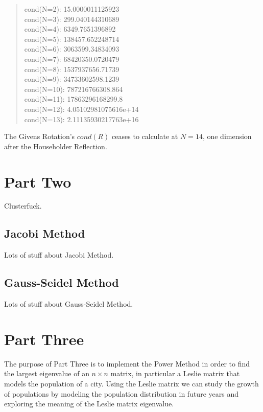 \documentclass[letterpaper,12pt]{article}
\begin{document}
\begin{quote}
cond(N=2):  15.0000011125923
\\cond(N=3):  299.040144310689
\\cond(N=4):  6349.7651396892
\\cond(N=5):  138457.652248714
\\cond(N=6):  3063599.34834093
\\cond(N=7):  68420350.0720479
\\cond(N=8):  1537937656.71739
\\cond(N=9):  34733602598.1239
\\cond(N=10): 787216766308.864
\\cond(N=11): 17863296168299.8
\\cond(N=12): 4.05102981075616e+14
\\cond(N=13): 2.11135930217763e+16
\end{quote}

The Givens Rotation's $cond(R)$ ceases to calculate at $N=14$,
one dimension after the Householder Reflection.

\newpage
\section{Part Two}


Clusterfuck.

\subsection{Jacobi Method}

Lots of stuff about Jacobi Method.

\subsection{Gauss-Seidel Method}

Lots of stuff about Gauss-Seidel Method.

\newpage
\section{Part Three}


The purpose of Part Three is to implement the Power Method in order to find the
largest eigenvalue of an $n \times n$ matrix, in particular a Leslie matrix that
models the population of a city. Using the Leslie matrix we can study the growth of populations by modeling the population distribution in future years and exploring the meaning of the Leslie matrix eigenvalue.
\end{document}
